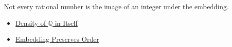 \begin{remark*}[Interpretation]
Not every rational number is the image of an integer under the embedding.
\end{remark*}

\begin{dependencies}
\begin{itemize}
  \item \hyperref[thm:density-of-q]{Density of $\mathbb{Q}$ in Itself}
  \item \hyperref[thm:embedding-z-into-q-preserves-order]{Embedding Preserves Order}
\end{itemize}
\end{dependencies}
